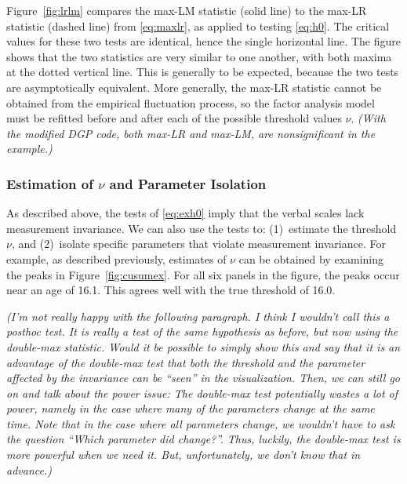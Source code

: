 \documentclass[man]{apa}
\newcommand{\fixme}[1]{\emph{\marginpar{FIXME} (#1)}}
\newcommand{\readme}[1]{\emph{\marginpar{README} (#1)}}
\begin{document}
Figure~\ref{fig:lrlm} 
compares the max-LM statistic (solid line) to the max-LR
statistic (dashed line) from \eqref{eq:maxlr}, as applied to testing
\eqref{eq:h0}.  The critical values for these two
tests are identical, hence the single horizontal line.
The figure
shows that the two statistics are very similar to one another, with
both maxima at the dotted vertical line.  This
is generally to be expected, because the two tests are asymptotically
equivalent.  More generally, the 
max-LR statistic cannot be obtained from the empirical fluctuation
process, so the factor analysis model must be refitted before and after
each of the possible threshold values $\nu$.
\readme{With the modified DGP code, both max-LR and max-LM, are
nonsignificant in the example.}

\subsubsection{Estimation of $\nu$ and Parameter Isolation}
As described above, the tests of \eqref{eq:exh0} imply that the 
verbal scales lack measurement invariance.  
We can also use the tests to: (1)~estimate the 
threshold $\nu$, and (2)~isolate specific parameters that violate
measurement invariance.  
For example, as described previously, estimates of $\nu$ can be obtained by
examining the peaks in Figure~\ref{fig:cusumex}.  For all six panels
in the figure, the peaks occur near an age of 16.1.  This agrees well
with the true threshold of 16.0.

\fixme{I'm not really happy with the following paragraph. I think
I wouldn't call this a posthoc test. It is really a test of the same
hypothesis as before, but now using the double-max
statistic. Would it be possible to simply show this and say that
it is an advantage of the double-max test that both the threshold
and the parameter affected by the invariance can be ``seen'' in the
visualization. Then, we can still go on and talk about the power issue:
The double-max test potentially wastes a lot of power, namely
in the case where many of the parameters change at the same time. Note
that in the case where all parameters change, we wouldn't have to ask
the question ``Which parameter did change?''. Thus, luckily, the double-max test
is more powerful when we need it. But, unfortunately, we don't know that
in advance.}
\end{document}

